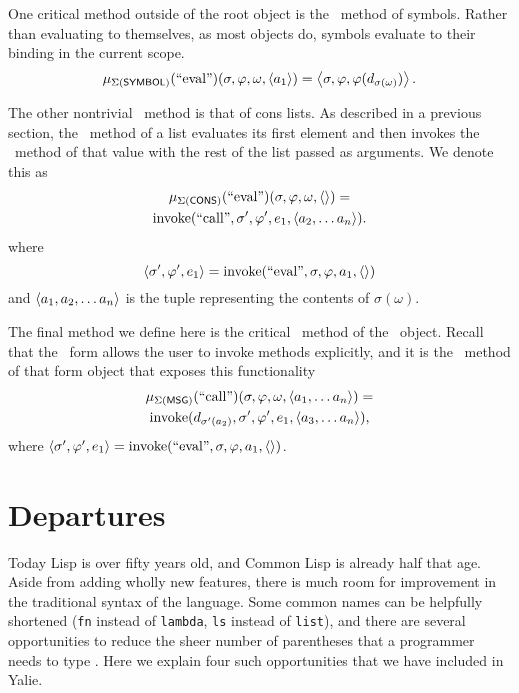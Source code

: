 \documentclass[twocolumn]{article}
\begin{document}
One critical method outside of the root object is the \eval\ method of
symbols. Rather than evaluating to themselves, as most objects do,
symbols evaluate to their binding in the current scope.
\[  \mu_{\Sigma(\mathsf{SYMBOL})}(\text{``eval''})(\sigma,\varphi,\omega,
\left< a_1\right>) = \left< \sigma, \varphi, \varphi(d_{\sigma(\omega)})\right>.\]

The other nontrivial \eval\ method is that of cons lists. As described
in a previous section, the \eval\ method of a list evaluates its first
element and then invokes the \call\ method of that value with the rest
of the list passed as arguments. We denote this as
\begin{multline*}
\mu_{\Sigma(\mathsf{CONS})}(\text{``eval''})(\sigma,\varphi,\omega,
\left<\right>) = \\\operatorname{invoke}(\text{``call''},\sigma',\varphi',e_1,\left< a_2,\ldots
a_n\right>).
\end{multline*}
where 
\[ \left< \sigma',\varphi',e_1\right> =
\operatorname{invoke}(\text{``eval''},\sigma,\varphi,a_1,\left<\right>) \]
and $\left< a_1,a_2,\ldots a_n\right>$ is the tuple representing the
contents of $\sigma(\omega)$.

The final method we define here is the critical \call\ method of the
\msg\ object. Recall that the \msg\ form allows the user to invoke
methods explicitly, and it is the \call\ method of that form object
that exposes this functionality
\begin{multline*}
  \mu_{\Sigma(\mathsf{MSG})}(\text{``call''})(\sigma,\varphi,\omega,
  \left< a_1,\ldots a_n \right>) = \\\operatorname{invoke}( d_{\sigma'(a_2)}, \sigma', \varphi', e_1,
  \left< a_3,\ldots a_n \right>),
\end{multline*}
where $\left< \sigma', \varphi', e_1\right> =
\operatorname{invoke}(\text{``eval''},\sigma,\varphi,a_1,\left<\right>)$.

\section*{Departures}
Today Lisp is over fifty years old, and Common Lisp is already half
that age. Aside from adding wholly new features, there is much room
for improvement in the traditional syntax of the language. Some common
names can be helpfully shortened (\texttt{fn} instead of
\texttt{lambda}, \texttt{ls} instead of \texttt{list}), and there are
several opportunities to reduce the sheer number of parentheses that a
programmer needs to type \cite{Graham}. Here we explain four such
opportunities that we have included in Yalie.
\end{document}
